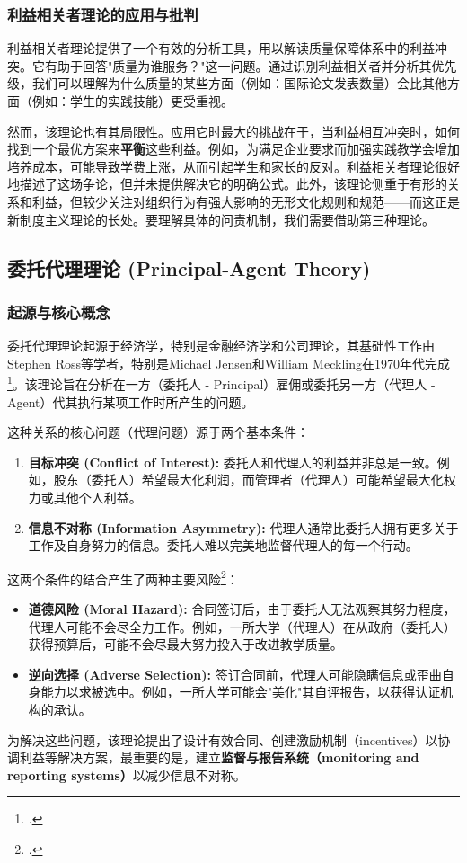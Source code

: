 \subsubsection{利益相关者理论的应用与批判}

利益相关者理论提供了一个有效的分析工具，用以解读质量保障体系中的利益冲突。它有助于回答"质量为谁服务？"这一问题。通过识别利益相关者并分析其优先级，我们可以理解为什么质量的某些方面（例如：国际论文发表数量）会比其他方面（例如：学生的实践技能）更受重视。

然而，该理论也有其局限性。应用它时最大的挑战在于，当利益相互冲突时，如何找到一个最优方案来\textbf{平衡}这些利益。例如，为满足企业要求而加强实践教学会增加培养成本，可能导致学费上涨，从而引起学生和家长的反对。利益相关者理论很好地描述了这场争论，但并未提供解决它的明确公式。此外，该理论侧重于有形的关系和利益，但较少关注对组织行为有强大影响的无形文化规则和规范——而这正是新制度主义理论的长处。要理解具体的问责机制，我们需要借助第三种理论。

\subsection{委托代理理论 (Principal-Agent Theory)}
\label{subsec:uy_nhiem_nen_tang}

\subsubsection{起源与核心概念}
委托代理理论起源于经济学，特别是金融经济学和公司理论，其基础性工作由Stephen Ross等学者，特别是Michael Jensen和William Meckling在1970年代完成\footcite{JensenMeckling1976}。该理论旨在分析在一方（委托人 - Principal）雇佣或委托另一方（代理人 - Agent）代其执行某项工作时所产生的问题。

这种关系的核心问题（代理问题）源于两个基本条件：
\begin{enumerate}
    \item \textbf{目标冲突 (Conflict of Interest):} 委托人和代理人的利益并非总是一致。例如，股东（委托人）希望最大化利润，而管理者（代理人）可能希望最大化权力或其他个人利益。
    \item \textbf{信息不对称 (Information Asymmetry):} 代理人通常比委托人拥有更多关于工作及自身努力的信息。委托人难以完美地监督代理人的每一个行动。
\end{enumerate}
这两个条件的结合产生了两种主要风险\footcite{Eisenhardt1989}：
\begin{itemize}
    \item \textbf{道德风险 (Moral Hazard):} 合同签订后，由于委托人无法观察其努力程度，代理人可能不会尽全力工作。例如，一所大学（代理人）在从政府（委托人）获得预算后，可能不会尽最大努力投入于改进教学质量。
    \item \textbf{逆向选择 (Adverse Selection):} 签订合同前，代理人可能隐瞒信息或歪曲自身能力以求被选中。例如，一所大学可能会"美化"其自评报告，以获得认证机构的承认。
\end{itemize}
为解决这些问题，该理论提出了设计有效合同、创建激励机制（incentives）以协调利益等解决方案，最重要的是，建立\textbf{监督与报告系统（monitoring and reporting systems）}以减少信息不对称。


